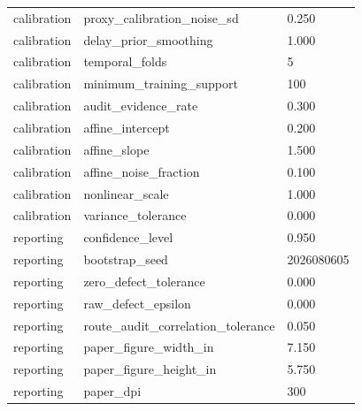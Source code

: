 \begin{table}[t]
\begin{tabular}{lll}
calibration & proxy_calibration_noise_sd & 0.250 \\
calibration & delay_prior_smoothing & 1.000 \\
calibration & temporal_folds & 5 \\
calibration & minimum_training_support & 100 \\
calibration & audit_evidence_rate & 0.300 \\
calibration & affine_intercept & 0.200 \\
calibration & affine_slope & 1.500 \\
calibration & affine_noise_fraction & 0.100 \\
calibration & nonlinear_scale & 1.000 \\
calibration & variance_tolerance & 0.000 \\
reporting & confidence_level & 0.950 \\
reporting & bootstrap_seed & 2026080605 \\
reporting & zero_defect_tolerance & 0.000 \\
reporting & raw_defect_epsilon & 0.000 \\
reporting & route_audit_correlation_tolerance & 0.050 \\
reporting & paper_figure_width_in & 7.150 \\
reporting & paper_figure_height_in & 5.750 \\
reporting & paper_dpi & 300 \\
\bottomrule
\end{tabular}
\end{table}
